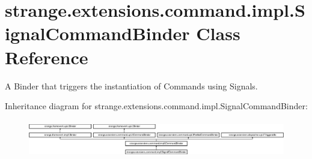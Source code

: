 \hypertarget{classstrange_1_1extensions_1_1command_1_1impl_1_1_signal_command_binder}{\section{strange.\-extensions.\-command.\-impl.\-Signal\-Command\-Binder Class Reference}
\label{classstrange_1_1extensions_1_1command_1_1impl_1_1_signal_command_binder}
}


A Binder that triggers the instantiation of Commands using Signals.  


Inheritance diagram for strange.\-extensions.\-command.\-impl.\-Signal\-Command\-Binder\-:\begin{figure}[H]
\begin{center}
\leavevmode
\includegraphics[height=1.642229cm]{classstrange_1_1extensions_1_1command_1_1impl_1_1_signal_command_binder}
\end{center}
\end{figure}
